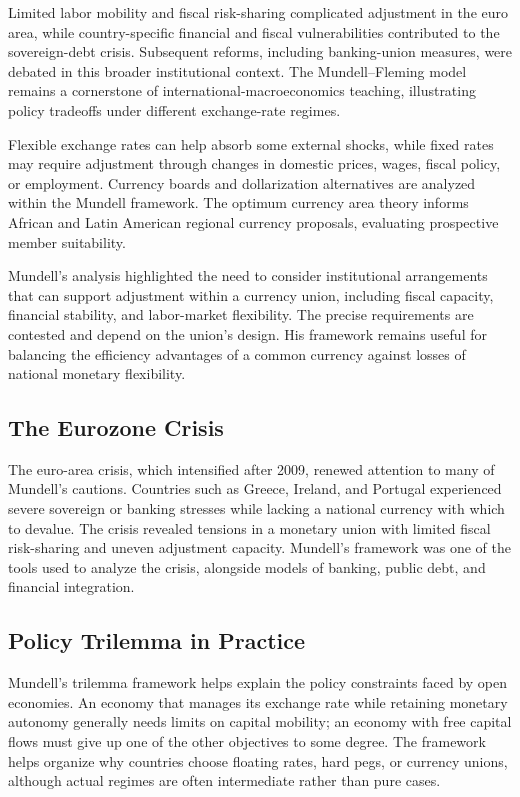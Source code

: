 Limited labor mobility and fiscal risk-sharing complicated adjustment in the
euro area, while country-specific financial and fiscal vulnerabilities contributed
to the sovereign-debt crisis. Subsequent reforms, including banking-union measures,
were debated in this broader institutional context. The Mundell--Fleming model
remains a cornerstone of international-macroeconomics teaching, illustrating
policy tradeoffs under different exchange-rate regimes.

Flexible exchange rates can help absorb some external shocks, while fixed rates
may require adjustment through changes in domestic prices, wages, fiscal policy,
or employment.
Currency boards and dollarization alternatives are analyzed within the Mundell
framework. The optimum currency area theory informs African and Latin American
regional currency proposals, evaluating prospective member suitability.

Mundell's analysis highlighted the need to consider institutional arrangements
that can support adjustment within a currency union, including fiscal capacity,
financial stability, and labor-market flexibility. The precise requirements are
contested and depend on the union's design. His framework remains useful for
balancing the efficiency advantages of a common currency against losses of national
monetary flexibility.

\subsection*{The Eurozone Crisis}
The euro-area crisis, which intensified after 2009, renewed attention to many of
Mundell's cautions. Countries such as Greece, Ireland, and Portugal experienced
severe sovereign or banking stresses while lacking a national currency with which
to devalue. The crisis revealed tensions in a monetary union with limited fiscal
risk-sharing and uneven adjustment capacity. Mundell's framework was one of the
tools used to analyze the crisis, alongside models of banking, public debt, and
financial integration.

\subsection*{Policy Trilemma in Practice}
Mundell's trilemma framework helps explain the policy constraints faced by open
economies. An economy that manages its exchange rate while retaining monetary
autonomy generally needs limits on capital mobility; an economy with free capital
flows must give up one of the other objectives to some degree. The framework helps
organize why countries choose floating rates, hard pegs, or currency unions,
although actual regimes are often intermediate rather than pure cases.

